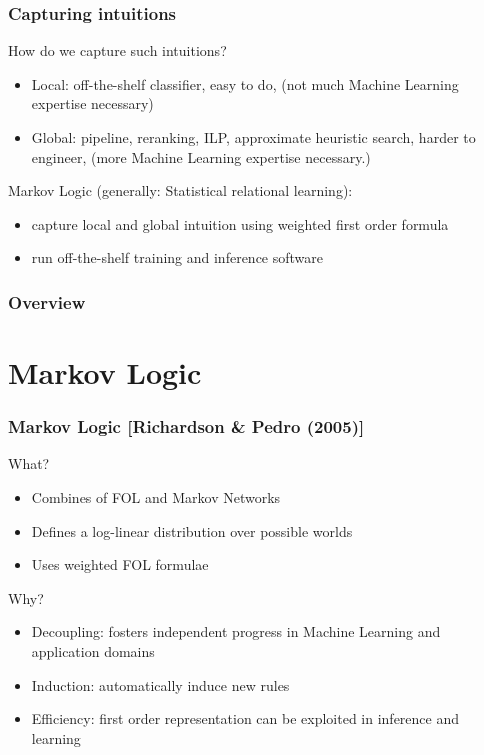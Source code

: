 \documentclass{beamer} \setbeamertemplate{navigation symbols}{}
\begin{document}
\begin{frame}
  \frametitle{Capturing intuitions}

    
  How do we capture such intuitions?

  \pause

  \begin{itemize}
  \item Local: off-the-shelf classifier, easy to do, (not much Machine
    Learning expertise necessary) \pause
  \item Global: pipeline, reranking, ILP, approximate heuristic
    search, harder to engineer, (more Machine Learning expertise
    necessary.)
  \end{itemize}

  \pause
     
  Markov Logic (generally: Statistical relational learning):
  \begin{itemize}

  \item capture local and global intuition using weighted first order
    formula
  \item run off-the-shelf training and inference software
  \end{itemize}



    
\end{frame}

\begin{frame}
  \frametitle{Overview}
  \tableofcontents
\end{frame}

\section{Markov Logic}

\begin{frame}
  \frametitle{Markov Logic [Richardson \& Pedro (2005)]}

  What?
  \begin{itemize}
  \item Combines of FOL and Markov Networks
  \item Defines a log-linear distribution over possible worlds
  \item Uses weighted FOL formulae
  \end{itemize}
  Why?
  \begin{itemize}
  \item Decoupling: fosters independent progress in Machine Learning
    and application domains
  \item Induction: automatically induce new rules
  \item Efficiency: first order representation can be exploited in
    inference and learning
  \end{itemize}


\end{frame}
\end{document}
